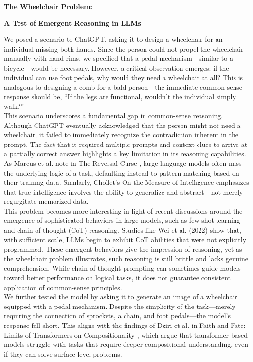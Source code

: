 \documentclass[11pt]{scrartcl}
\begin{document}
\begin{huge}
\textbf{The Wheelchair Problem:}
\end{huge}
\begin{large}
\textbf{A Test of Emergent Reasoning in LLMs}
\end{large}
We posed a scenario to ChatGPT, asking it to design a wheelchair for an individual missing both hands. Since the person could not propel the wheelchair manually with hand rims, we specified that a pedal mechanism—similar to a bicycle—would be necessary. However, a critical observation emerges: if the individual can use foot pedals, why would they need a wheelchair at all? This is analogous to designing a comb for a bald person—the immediate common-sense response should be, “If the legs are functional, wouldn’t the individual simply walk?”\\

This scenario underscores a fundamental gap in common-sense reasoning. Although ChatGPT eventually acknowledged that the person might not need a wheelchair, it failed to immediately recognize the contradiction inherent in the prompt. The fact that it required multiple prompts and context clues to arrive at a partially correct answer highlights a key limitation in its reasoning capabilities. As Marcus et al. note in The Reversal Curse \cite{ref1}, large language models often miss the underlying logic of a task, defaulting instead to pattern-matching based on their training data. Similarly, Chollet’s On the Measure of Intelligence \cite{ref3} emphasizes that true intelligence involves the ability to generalize and abstract—not merely regurgitate memorized data.\\

This problem becomes more interesting in light of recent discussions around the emergence of sophisticated behaviors in large models, such as few-shot learning and chain-of-thought (CoT) reasoning. Studies like Wei et al. (2022) \cite{ref12} show that, with sufficient scale, LLMs begin to exhibit CoT abilities that were not explicitly programmed. These emergent behaviors give the impression of reasoning, yet as the wheelchair problem illustrates, such reasoning is still brittle and lacks genuine comprehension. While chain-of-thought prompting can sometimes guide models toward better performance on logical tasks, it does not guarantee consistent application of common-sense principles.\\

We further tested the model by asking it to generate an image of a wheelchair equipped with a pedal mechanism. Despite the simplicity of the task—merely requiring the connection of sprockets, a chain, and foot pedals—the model’s response fell short. This aligns with the findings of Dziri et al. in Faith and Fate: Limits of Transformers on Compositionality \cite{ref4}, which argue that transformer-based models struggle with tasks that require deeper compositional understanding, even if they can solve surface-level problems.\\
\end{document}
